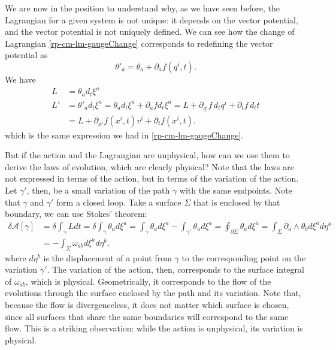 We are now in the position to understand why, as we have seen before, the Lagrangian for a given system is not unique: it depends on the vector potential, and the vector potential is not uniquely defined. We can see how the change of Lagrangian \ref{rp-cm-lm-gaugeChange} corresponds to redefining the vector potential as
\begin{equation}
	\theta'_{a} = \theta_a + \partial_a f(q^i,t).
\end{equation}
We have
\begin{equation}
	\begin{aligned}
		L &= \theta_a d_t \xi^a \\
		L' &= \theta'_a d_t \xi^a = \theta_a d_t \xi^a + \partial_a f d_t \xi^a = L + \partial_{q^i} f \, d_t {q^i} + \partial_t f \, d_t t \\
		&= L + \partial_{x^i} f(x^i, t) v^i + \partial_t f(x^i, t).
	\end{aligned}
\end{equation}
which is the same expression we had in \ref{rp-cm-lm-gaugeChange}.

But if the action and the Lagrangian are unphysical, how can we use them to derive the laws of evolution, which are clearly physical? Note that the laws are not expressed in terms of the action, but in terms of the variation of the action. Let $\gamma'$, then, be a small variation of the path $\gamma$ with the same endpoints. Note that $\gamma$ and $\gamma'$ form a closed loop. Take a surface $\Sigma$ that is enclosed by that boundary, we can use Stokes' theorem:
\begin{equation}
	\begin{aligned}
		\delta \mathcal{A}[\gamma] &= \delta \int_\gamma L dt = \delta \int_\gamma \theta_a d\xi^a = \int_\gamma \theta_a d\xi^a - \int_{\gamma'} \theta_a d\xi^a = \oint_{\partial\Sigma} \theta_a d\xi^a = \int_{\Sigma} \partial_a \wedge \theta_b  d\xi^a d\eta^b \\
		&= - \int_{\Sigma} \omega_{ab} d\xi^a d\eta^b, 
	\end{aligned}
\end{equation}
where $d\eta^b$ is the displacement of a point from $\gamma$ to the corresponding point on the variation $\gamma'$. The variation of the action, then, corresponds to the surface integral of $\omega_{ab}$, which is physical. Geometrically, it corresponds to the flow of the evolutions through the surface enclosed by the path and its variation. Note that, because the flow is divergenceless, it does not matter which surface is chosen, since all surfaces that share the same boundaries will correspond to the same flow. This is a striking observation: while the action is unphysical, its variation is physical.

